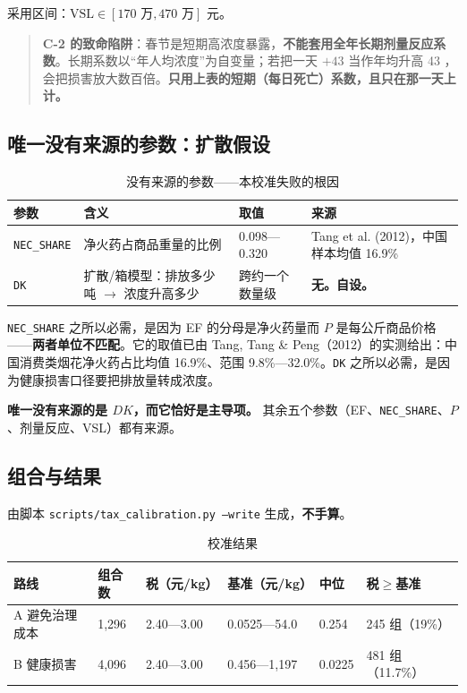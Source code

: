 采用区间：$\mathrm{VSL}\in[170\text{ 万},470\text{ 万}]$ 元。

\begin{quote}
\textbf{C-2 的致命陷阱}：春节是短期高浓度暴露，\textbf{不能套用全年长期剂量反应系数}。长期系数以“年人均浓度”为自变量；若把一天 $+43$ \ugm{} 当作年均升高 43 \ugm{}，会把损害放大数百倍。\textbf{只用上表的短期（每日死亡）系数，且只在那一天上计。}
\end{quote}

\subsection{唯一没有来源的参数：扩散假设}

\begin{table}[H]
\centering
\caption{没有来源的参数——本校准失败的根因}
\label{tab:nosource}
\small
\begin{tabular}{L{2.8cm}L{6.6cm}L{2.8cm}L{2.4cm}}
\toprule
\textbf{参数} & \textbf{含义} & \textbf{取值} & \textbf{来源} \\
\midrule
\texttt{NEC\_SHARE} & 净火药占商品重量的比例 & 0.098—0.320 & Tang et al. (2012)，中国样本均值 16.9\% \\
\texttt{DK} & 扩散/箱模型：排放多少吨 $\rightarrow$ 浓度升高多少 & 跨约一个数量级 & \textbf{无。自设。} \\
\bottomrule
\end{tabular}
\end{table}

\texttt{NEC\_SHARE} 之所以必需，是因为 EF 的分母是净火药量而 $P$ 是每公斤商品价格——\textbf{两者单位不匹配}。它的取值已由 Tang, Tang \& Peng（2012）的实测给出：中国消费类烟花净火药占比均值 16.9\%、范围 9.8\%—32.0\%。\texttt{DK} 之所以必需，是因为健康损害口径要把排放量转成浓度。

\textbf{唯一没有来源的是 $DK$，而它恰好是主导项。} 其余五个参数（EF、\texttt{NEC\_SHARE}、$P$、剂量反应、VSL）都有来源。

\subsection{组合与结果}

由脚本 \texttt{scripts/tax\_calibration.py --write} 生成，\textbf{不手算}。

\begin{table}[H]
\centering
\caption{校准结果}
\label{tab:calib-app}
\small
\begin{tabular}{L{2.8cm}R{1.4cm}R{2.4cm}R{2.6cm}R{1.7cm}R{2.3cm}}
\toprule
\textbf{路线} & \textbf{组合数} & \textbf{税（元/kg）} & \textbf{基准（元/kg）} & \textbf{中位} & \textbf{税$\geq$基准} \\
\midrule
A 避免治理成本 & 1,296 & 2.40—3.00 & 0.0525—54.0 & 0.254 & 245 组（19\%） \\
B 健康损害 & 4,096 & 2.40—3.00 & 0.456—1,197 & 0.0225 & 481 组（11.7\%） \\
\bottomrule
\end{tabular}
\end{table}


